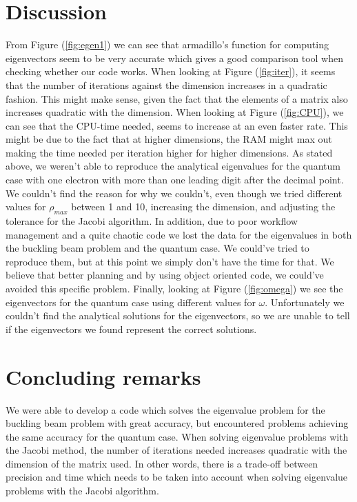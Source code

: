 \documentclass[norsk,a4paper,12pt]{article}
\begin{document}
\section{Discussion}
From Figure (\ref{fig:egen1}) we can see that armadillo's function for computing eigenvectors seem to be very accurate which gives a good comparison tool when checking whether our code works. When looking at Figure (\ref{fig:iter}), it seems that the number of iterations against the dimension increases in a quadratic fashion. This might make sense, given the fact that the elements of a matrix also increases quadratic with the dimension. When looking at Figure (\ref{fig:CPU}), we can see that the CPU-time needed, seems to increase at an even faster rate. This might be due to the fact that at higher dimensions, the RAM might max out making the time needed per iteration higher for higher dimensions. As stated above, we weren't able to reproduce the analytical eigenvalues for the quantum case with one electron with more than one leading digit after the decimal point. We couldn't find the reason for why we couldn't, even though we tried different values for $\rho_{max}$ between 1 and 10, increasing the dimension, and adjusting the tolerance for the Jacobi algorithm. In addition, due to poor workflow management and a quite chaotic code we lost the data for the eigenvalues in both the buckling beam problem and the quantum case. We could've tried to reproduce them, but at this point we simply don't have the time for that. We believe that better planning and by using object oriented code, we could've avoided this specific problem. Finally, looking at Figure (\ref{fig:omega}) we see the eigenvectors for the quantum case using different values for $\omega$. Unfortunately we couldn't find the analytical solutions for the eigenvectors, so we are unable to tell if the eigenvectors we found represent the correct solutions.  

\section{Concluding remarks}
We were able to develop a code which solves the eigenvalue problem for the buckling beam problem with great accuracy, but encountered problems achieving the same accuracy for the quantum case. When solving eigenvalue problems with the Jacobi method, the number of iterations needed increases quadratic with the dimension of the matrix used. In other words, there is a trade-off between precision and time which needs to be taken into account when solving eigenvalue problems with the Jacobi algorithm. 

\end{document}
